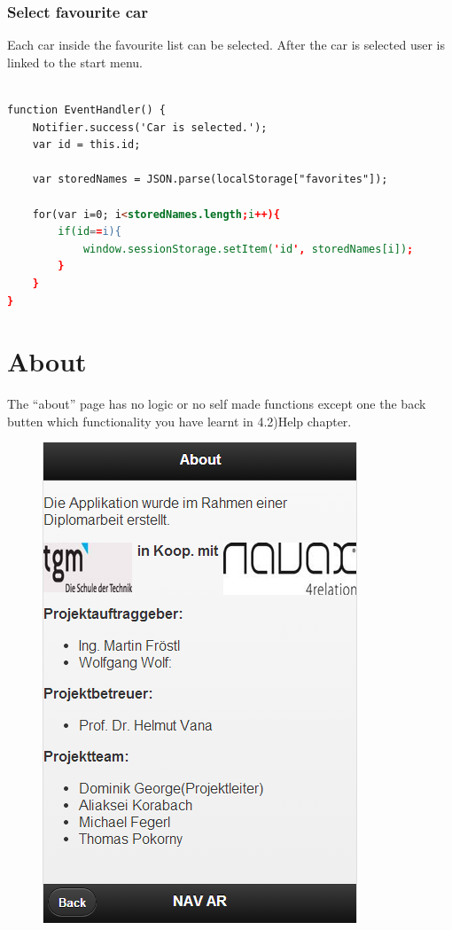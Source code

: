 \subsubsection{Select favourite car}
Each car inside the favourite list can be selected. After the car is selected user is linked to the start menu.
\\

\begin{lstlisting}[language=html, caption=
start timer function,captionpos=b] 

function EventHandler() {
	Notifier.success('Car is selected.');
	var id = this.id;
	
	var storedNames = JSON.parse(localStorage["favorites"]);
	
	for(var i=0; i<storedNames.length;i++){
		if(id==i){
			window.sessionStorage.setItem('id', storedNames[i]);
		}
	}
}
\end{lstlisting}

\section{About}
The “about” page has no logic or no self made functions except one the back butten which functionality you have learnt in 4.2)Help chapter.
\\
\begin{figure}[h]
\centering
\includegraphics[width=0.4\linewidth]{graphics/chapter4/17}
\caption{}
\label{fig:18}
\end{figure}